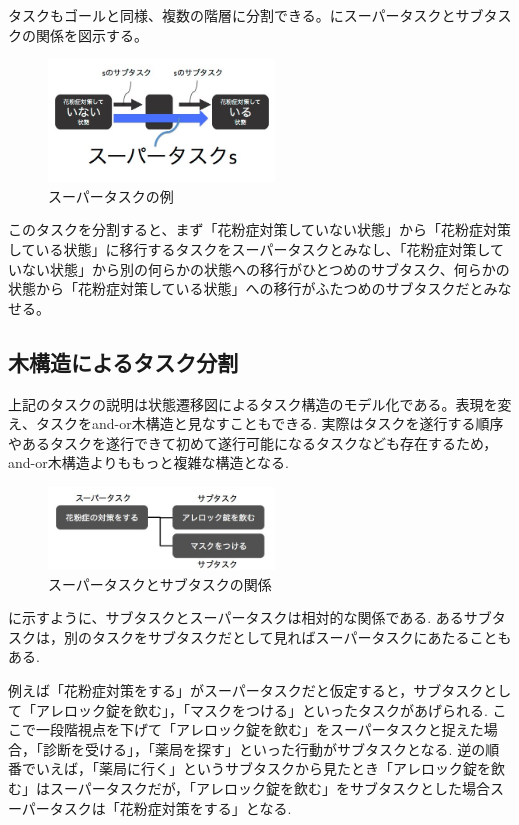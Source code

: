 \documentclass[submit,techreq]{ipsj}
\begin{document}
タスクもゴールと同様、複数の階層に分割できる。にスーパータスクとサブタスクの関係を図示する。

\begin{figure}[tb]
\includegraphics[width=6cm, bb=0 0 400 300]{super_task.jpg}
\caption{スーパータスクの例}
\label{fig:super_task}
\end{figure}

このタスクを分割すると、まず「花粉症対策していない状態」から「花粉症対策している状態」に移行するタスクをスーパータスクとみなし、「花粉症対策していない状態」から別の何らかの状態への移行がひとつめのサブタスク、何らかの状態から「花粉症対策している状態」への移行がふたつめのサブタスクだとみなせる。

\subsection{木構造によるタスク分割}

上記のタスクの説明は状態遷移図によるタスク構造のモデル化である。表現を変え、タスクをand-or木構造と見なすこともできる. 実際はタスクを遂行する順序やあるタスクを遂行できて初めて遂行可能になるタスクなども存在するため，and-or木構造よりももっと複雑な構造となる.


\begin{figure}[tb]
\includegraphics[width=6cm, bb=0 0 400 272]{super_sub.jpg}
\caption{スーパータスクとサブタスクの関係}
\label{fig:super_sub}
\end{figure}

に示すように、サブタスクとスーパータスクは相対的な関係である. あるサブタスクは，別のタスクをサブタスクだとして見ればスーパータスクにあたることもある.

例えば「花粉症対策をする」がスーパータスクだと仮定すると，サブタスクとして「アレロック錠を飲む」，「マスクをつける」といったタスクがあげられる. ここで一段階視点を下げて「アレロック錠を飲む」をスーパータスクと捉えた場合，「診断を受ける」，「薬局を探す」といった行動がサブタスクとなる. 逆の順番でいえば，「薬局に行く」というサブタスクから見たとき「アレロック錠を飲む」はスーパータスクだが，「アレロック錠を飲む」をサブタスクとした場合スーパータスクは「花粉症対策をする」となる.
\end{document}
